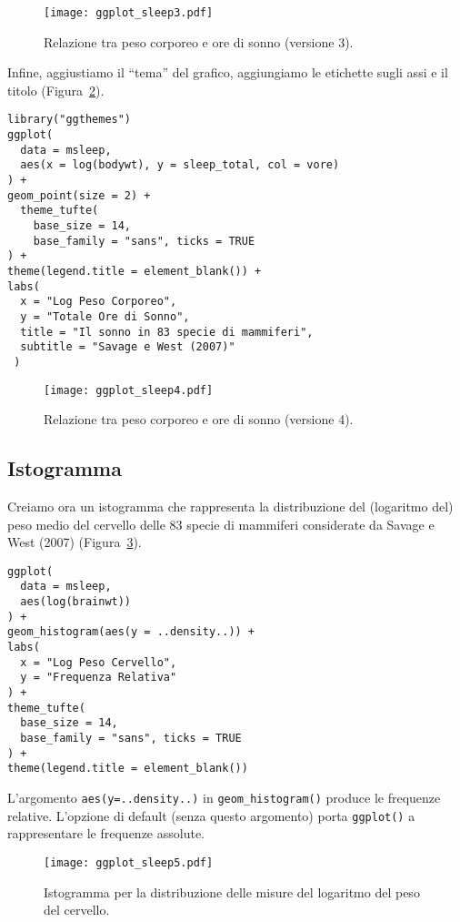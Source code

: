 \begin{figure}[h!]
   \centering
    \texttt{[image: ggplot\_sleep3.pdf]}
   \caption{Relazione tra peso corporeo e ore di sonno (versione 3).}
    \label{fig:ggplot2_sleep3}
\end{figure}

\noindent
Infine, aggiustiamo il ``tema'' del grafico, aggiungiamo le etichette sugli assi e il titolo (Figura~\ref{fig:ggplot2_sleep4}).
\begin{lstlisting}
library("ggthemes")
ggplot(
  data = msleep,
  aes(x = log(bodywt), y = sleep_total, col = vore)
) +
geom_point(size = 2) +
  theme_tufte(
    base_size = 14,
    base_family = "sans", ticks = TRUE
) +
theme(legend.title = element_blank()) +
labs(
  x = "Log Peso Corporeo",
  y = "Totale Ore di Sonno",
  title = "Il sonno in 83 specie di mammiferi",
  subtitle = "Savage e West (2007)"
 )
\end{lstlisting}

\begin{figure}[h!]
   \centering
    \texttt{[image: ggplot\_sleep4.pdf]}
   \caption{Relazione tra peso corporeo e ore di sonno (versione 4).}
    \label{fig:ggplot2_sleep4}
\end{figure}

\subsection{Istogramma}

Creiamo ora un istogramma che rappresenta la distribuzione del (logaritmo del) peso medio del cervello delle 83 specie di mammiferi considerate da Savage e West (2007)  (Figura~\ref{fig:ggplot2_sleep5}). 
\begin{lstlisting}
ggplot(
  data = msleep,
  aes(log(brainwt))
) +
geom_histogram(aes(y = ..density..)) +
labs(
  x = "Log Peso Cervello",
  y = "Frequenza Relativa"
) +
theme_tufte(
  base_size = 14,
  base_family = "sans", ticks = TRUE
) +
theme(legend.title = element_blank())
\end{lstlisting}
L'argomento \verb+aes(y=..density..)+ in \verb+geom_histogram()+ produce le frequenze relative. 
L'opzione di default (senza questo argomento) porta \verb+ggplot()+ a rappresentare le frequenze assolute.

\begin{figure}[h!]
   \centering
    \texttt{[image: ggplot\_sleep5.pdf]}
   \caption{Istogramma per la distribuzione delle misure del logaritmo del peso del cervello.}
    \label{fig:ggplot2_sleep5}
\end{figure}


